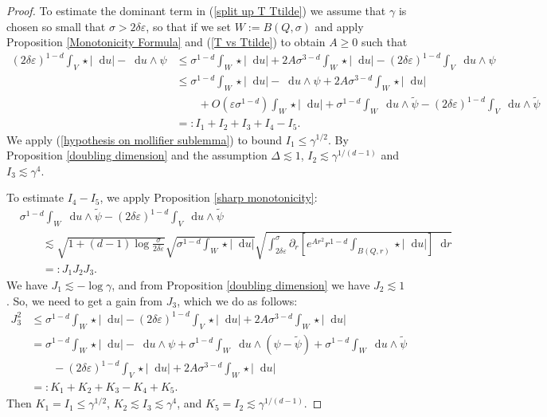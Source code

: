 \documentclass[reqno,12pt,letterpaper]{amsart}
\newcommand*\dif{\mathop{}\!\mathrm{d}}
\theoremstyle{definition}
\numberwithin{equation}{section}
\begin{document}
\begin{proof}
To estimate the dominant term in (\ref{split up T Ttilde}) we assume that $\gamma$ is chosen so small that $\sigma > 2\delta\varepsilon$, so that if we set $W := B(Q, \sigma)$ and apply Proposition \ref{Monotonicity Formula} and (\ref{T vs Ttilde}) to obtain $A \geq 0$ such that
\begin{align*}
(2\delta\varepsilon)^{1 - d} \int_V \star |\dif u| - \dif u \wedge \psi
&\leq \sigma^{1 - d}\int_W \star |\dif u| + 2A\sigma^{3 - d} \int_W \star |\dif u| - (2\delta\varepsilon)^{1 - d}\int_V \dif u \wedge \psi\\
&\leq \sigma^{1 - d}\int_W \star |\dif u| - \dif u \wedge \psi + 2A\sigma^{3 - d} \int_W \star |\dif u| \\
&\qquad + O(\varepsilon \sigma^{1 - d}) \int_W \star |\dif u| + \sigma^{1 - d}\int_W \dif u \wedge \tilde \psi - (2\delta\varepsilon)^{1 - d}\int_V \dif u \wedge \tilde \psi\\
&=: I_1 + I_2 + I_3 + I_4 - I_5.
\end{align*}
We apply (\ref{hypothesis on mollifier sublemma}) to bound $I_1 \leq \gamma^{1/2}$.
By Proposition \ref{doubling dimension} and the assumption $\Delta \lesssim 1$, $I_2 \lesssim \gamma^{1/(d - 1)}$ and $I_3 \lesssim \gamma^4$.

To estimate $I_4 - I_5$, we apply Proposition \ref{sharp monotonicity}:
\begin{align*}
&\sigma^{1 - d} \int_W \dif u \wedge \tilde \psi - (2\delta\varepsilon)^{1 - d} \int_V \dif u \wedge \tilde \psi \\
&\qquad \lesssim \sqrt{1 + (d - 1) \log \frac{\sigma}{2\delta\varepsilon}} \sqrt{\sigma^{1 - d} \int_W \star |\dif u|} \sqrt{\int_{2\delta\varepsilon}^\sigma \partial_r \left[e^{Ar^2} r^{1 - d} \int_{B(Q, r)} \star |\dif u|\right] \dif r}\\
&\qquad =: J_1 J_2 J_3.
\end{align*}
We have $J_1 \lesssim -\log \gamma$, and from Proposition \ref{doubling dimension} we have $J_2 \lesssim 1$.
So, we need to get a gain from $J_3$, which we do as follows:
\begin{align*}
J_3^2 &\leq \sigma^{1 - d} \int_W \star |\dif u| - (2 \delta \varepsilon)^{1 - d} \int_V \star |\dif u| + 2A\sigma^{3 - d} \int_W \star |\dif u| \\
&= \sigma^{1 - d} \int_W \star |\dif u| - \dif u \wedge \psi + \sigma^{1 - d} \int_W \dif u \wedge (\psi - \tilde \psi) + \sigma^{1 - d} \int_W \dif u \wedge \tilde \psi \\
&\qquad - (2 \delta\varepsilon)^{1 - d} \int_V \star |\dif u| + 2A \sigma^{3 - d} \int_W \star |\dif u| \\
&=: K_1 + K_2 + K_3 - K_4 + K_5.
\end{align*}
Then $K_1 = I_1 \leq \gamma^{1/2}$, $K_2 \lesssim I_3 \lesssim \gamma^4$, and $K_5 = I_2 \lesssim \gamma^{1/(d - 1)}$.


\end{proof}
\end{document}
